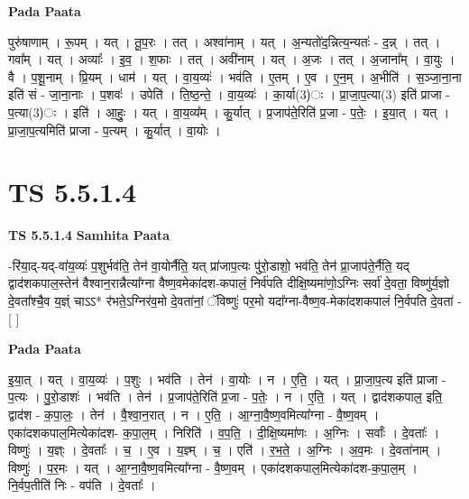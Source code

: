 \documentclass[17pt]{extarticle}
\begin{document}
\textbf{Pada Paata} \newline

पुरु॑षाणाम् । रू॒पम् । यत् । तू॒प॒रः । तत् । अश्वा॑नाम् । यत् । अ॒न्यतो॑द॒न्नित्य॒न्यतः॑ - द॒न्न् । तत् । गवा᳚म् । यत् । अव्याः᳚ । इ॒व॒ । श॒फाः । तत् । अवी॑नाम् । यत् । अ॒जः । तत् । अ॒जाना᳚म् । वा॒युः । वै । प॒शू॒नाम् । प्रि॒यम् । धाम॑ । यत् । वा॒य॒व्यः॑ । भव॑ति । ए॒तम् । ए॒व । ए॒न॒म् । अ॒भीति॑ । स॒ञ्जा॒ना॒ना इति॑ सं - जा॒ना॒नाः । प॒शवः॑ । उपेति॑ । ति॒ष्ठ॒न्ते॒ । वा॒य॒व्यः॑ । का॒र्या(3)ः । प्रा॒जा॒प॒त्या(3) इति॑ प्राजा - प॒त्या(3)ः । इति॑ । आ॒हुः॒ । यत् । वा॒य॒व्य᳚म् । कु॒र्यात् । प्र॒जाप॑ते॒रिति॑ प्र॒जा - प॒तेः॒ । इ॒या॒त् । यत् । प्रा॒जा॒प॒त्यमिति॑ प्राजा - प॒त्यम् । कु॒र्यात् । वा॒योः ।  \newline




\section*{ TS 5.5.1.4 }

\textbf{TS 5.5.1.4 } \newline
\textbf{Samhita Paata} \newline

-रि॑या॒द्-यद्-वा॑य॒व्यः॑ प॒शुर्भव॑ति॒ तेन॑ वा॒योर्नैति॒ यत् प्रा॑जाप॒त्यः पु॑रो॒डाशो॒ भव॑ति॒ तेन॑ प्रा॒जाप॑ते॒र्नैति॒ यद् द्वाद॑शकपाल॒स्तेन॑ वैश्वान॒रान्नैत्या᳚ग्ना वैष्ण॒वमेका॑दश-कपालं॒ निर्व॑पति दीक्षि॒ष्यमा॑णो॒ऽग्निः सर्वा॑ दे॒वता॒ विष्णु॑र्य॒ज्ञो दे॒वता᳚श्चै॒व य॒ज्ञ्ं चाऽऽ* र॑भते॒ऽग्निर॑व॒मो दे॒वता॑नां॒ ॅविष्णुः॑ पर॒मो यदा᳚ग्ना-वैष्ण॒व-मेका॑दशकपालं नि॒र्वपति दे॒वता॑ - [  ] \newline

\textbf{Pada Paata} \newline

इ॒या॒त् । यत् । वा॒य॒व्यः॑ । प॒शुः । भव॑ति । तेन॑ । वा॒योः । न । ए॒ति॒ । यत् । प्रा॒जा॒प॒त्य इति॑ प्राजा - प॒त्यः । पु॒रो॒डाशः॑ । भव॑ति । तेन॑ । प्र॒जाप॑ते॒रिति॑ प्र॒जा - प॒तेः॒ । न । ए॒ति॒ । यत् । द्वाद॑शकपाल॒ इति॒ द्वाद॑श - क॒पा॒लः॒ । तेन॑ । वै॒श्वा॒न॒रात् । न । ए॒ति॒ । आ॒ग्ना॒वै॒ष्ण॒वमित्या᳚ग्ना - वै॒ष्ण॒वम् । एका॑दशकपाल॒मित्येका॑दश- क॒पा॒ल॒म् । निरिति॑ । व॒प॒ति॒ । दी॒क्षि॒ष्यमा॑णः । अ॒ग्निः । सर्वाः᳚ । दे॒वताः᳚ । विष्णुः॑ । य॒ज्ञ्ः । दे॒वताः᳚ । च॒ । ए॒व । य॒ज्ञ्म् । च॒ । एति॑ । र॒भ॒ते॒ । अ॒ग्निः । अ॒व॒मः । दे॒वता॑नाम् । विष्णुः॑ । प॒र॒मः । यत् । आ॒ग्ना॒वै॒ष्ण॒वमित्या᳚ग्ना - वै॒ष्ण॒वम् । एका॑दशकपाल॒मित्येका॑दश-क॒पा॒ल॒म् । नि॒र्वप॒तीति॑ निः - वप॑ति । दे॒वताः᳚ ।  \newline
\end{document}
